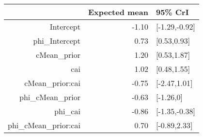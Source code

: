 \begin{tabular}{rrl}
  \hline
 & Expected mean & 95\% CrI \\ 
  \hline
Intercept & -1.10 & [-1.29,-0.92] \\ 
  phi\_Intercept & 0.73 & [0.53,0.93] \\ 
  cMean\_prior & 1.20 & [0.53,1.87] \\ 
  cai & 1.02 & [0.48,1.55] \\ 
  cMean\_prior:cai & -0.75 & [-2.47,1.01] \\ 
  phi\_cMean\_prior & -0.63 & [-1.26,0] \\ 
  phi\_cai & -0.86 & [-1.35,-0.38] \\ 
  phi\_cMean\_prior:cai & 0.70 & [-0.89,2.33] \\ 
   \hline
\end{tabular}

